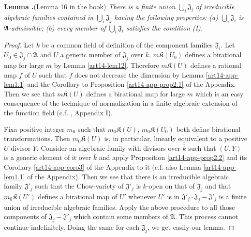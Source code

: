 \medskip
\noindent
{\bf Lemma .\label{art14-lem17}}(Lemma 16 in the book)
{\em There is a finite union $\bigcup_{i}\mathfrak{J}_{i}$ of irreducible algebraic families contained in $\bigcup_{i}\mathfrak{J}_{j}$ having the following properties: {\rm(a)} $\bigcup_{i}\mathfrak{J}_{i}$ is $\mathfrak{A}$-admissible; {\rm(b)} every member of $\bigcup_{i}\mathfrak{J}_{i}$ satisfies the condition {\rm(I)}.}

\begin{proof}
Let $k$ be a common field of definition of the component families $\mathfrak{J}_{i}$. Let $U_{0}\in \mathfrak{J}_{j}\cap \mathfrak{A}$ and $U$ a generic member of $\mathfrak{J}_{j}$ over $k$. $m\mathfrak{K}(U_{0})$ defines a birational map for large $m$ by Lemma \ref{art14-lem12}. Therefore $m\mathfrak{K}(U)$ defines a rational map $f$ of $U$ such that $f$ does not decrease the dimension by Lemma \ref{art14-app-lem1.1} and the Corollary to Proposition \ref{art14-app-prop2.1} of the Appendix. Then we see that $m\mathfrak{K}(U)$ defines a birational map for large $m$ which is an easy consequence of the technique of normalization in a finite algebraic extension of the function field (c.f. \cite{art14-key25}, Appendix I).

Fix\pageoriginale a positive integer $m_{0}$ such that $m_{0}\mathfrak{K}(U)$, $m_{0}\mathfrak{K}(U_{0})$ both define birational transformations. Then $m_{0}\mathfrak{K}(U)$ is, in particular, linearly equivalent to a positive $U$-divisor $Y$. Consider an algebraic family with divisors over $\overline{k}$ such that $(U,Y)$ is a generic element of it over $\overline{k}$ and apply Proposition \ref{art14-app-prop2.2} and its Corollary \ref{art14-app-coro3} of the Appendix to it (c.f. also Lemma \ref{art14-app-lem1.1} of the Appendix). Then we see that there is an irreducible algebraic family $\mathfrak{J}'_{j}$ such that the Chow-variety of $\mathfrak{J}'_{j}$ is $k$-open on that of $\mathfrak{J}_{j}$ and that $m_{0}\mathfrak{K}(U')$ defines a birational map of $U'$ whenever $U'$ is in $\mathfrak{J}'_{j}\cdot \mathfrak{J}_{j}-\mathfrak{J}'_{j}$ is a finite union of irreducible algebraic families. Apply the above procedure to all those components of $\mathfrak{J}_{j}-\mathfrak{J}'_{j}$ which contain some members of $\mathfrak{A}$. This process cannot continue indefinitely. Doing the same for each $\mathfrak{J}_{j}$, we get easily our lemma.
\end{proof}

